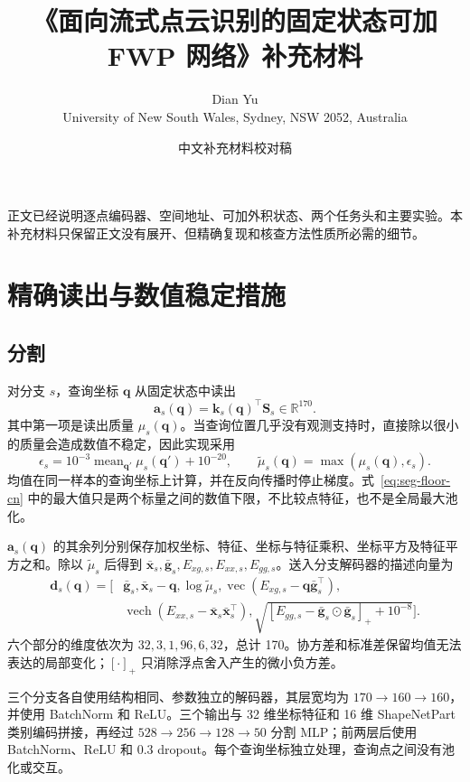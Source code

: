 \documentclass[UTF8,a4paper,11pt,fontset=windows]{ctexart}
\title{《面向流式点云识别的固定状态可加 FWP 网络》补充材料}
\author{Dian Yu\\University of New South Wales, Sydney, NSW 2052, Australia}
\date{中文补充材料校对稿}
\newcommand{\R}{\mathbb{R}}
\newcommand{\Sstate}{\mathbf{S}}
\newcommand{\vect}{\operatorname{vec}}
\begin{document}
\maketitle

正文已经说明逐点编码器、空间地址、可加外积状态、两个任务头和主要实验。本补充材料只保留正文没有展开、但精确复现和核查方法性质所必需的细节。

\section{精确读出与数值稳定措施}

\subsection{分割}

对分支 $s$，查询坐标 $\bm q$ 从固定状态中读出
\[
\bm a_s(\bm q)=\bm k_s(\bm q)^\top\Sstate_s\in\R^{170}.
\]
其中第一项是读出质量 $\mu_s(\bm q)$。当查询位置几乎没有观测支持时，直接除以很小的质量会造成数值不稳定，因此实现采用
\begin{equation}
\epsilon_s=10^{-3}\operatorname{mean}_{\bm q'}\mu_s(\bm q')+10^{-20},
\qquad
\widetilde\mu_s(\bm q)=\max(\mu_s(\bm q),\epsilon_s).
\label{eq:seg-floor-cn}
\end{equation}
均值在同一样本的查询坐标上计算，并在反向传播时停止梯度。式~\eqref{eq:seg-floor-cn} 中的最大值只是两个标量之间的数值下限，不比较点特征，也不是全局最大池化。

$\bm a_s(\bm q)$ 的其余列分别保存加权坐标、特征、坐标与特征乘积、坐标平方及特征平方之和。除以 $\widetilde\mu_s$ 后得到 $\bar{\bm x}_s,\bar{\bm g}_s,E_{xg,s},E_{xx,s},E_{gg,s}$。送入分支解码器的描述向量为
\begin{equation}
\begin{aligned}
\bm d_s(\bm q)=[&\bar{\bm g}_s,\bar{\bm x}_s-\bm q,\log\widetilde\mu_s,
\vect(E_{xg,s}-\bm q\bar{\bm g}_s^\top),\\
&\operatorname{vech}(E_{xx,s}-\bar{\bm x}_s\bar{\bm x}_s^\top),
\sqrt{[E_{gg,s}-\bar{\bm g}_s\odot\bar{\bm g}_s]_++10^{-8}}].
\end{aligned}
\label{eq:seg-descriptor-cn}
\end{equation}
六个部分的维度依次为 $32,3,1,96,6,32$，总计 170。协方差和标准差保留均值无法表达的局部变化；$[\cdot]_+$ 只消除浮点舍入产生的微小负方差。

三个分支各自使用结构相同、参数独立的解码器，其层宽均为 $170\rightarrow160\rightarrow160$，并使用 BatchNorm 和 ReLU。三个输出与 32 维坐标特征和 16 维 ShapeNetPart 类别编码拼接，再经过 $528\rightarrow256\rightarrow128\rightarrow50$ 分割 MLP；前两层后使用 BatchNorm、ReLU 和 0.3 dropout。每个查询坐标独立处理，查询点之间没有池化或交互。
\end{document}
